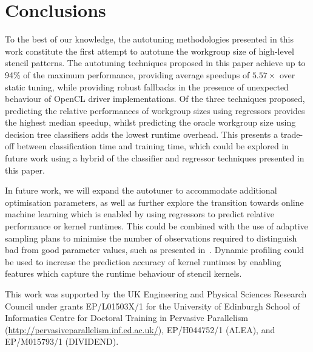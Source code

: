 \documentclass[preprint,nonatbib,10pt]{sigplanconf}
\begin{document}
\section{Conclusions}\label{sec:conclusions}

To the best of our knowledge, the autotuning methodologies presented
in this work constitute the first attempt to autotune the workgroup
size of high-level stencil patterns. The autotuning techniques
proposed in this paper achieve up to 94\% of the maximum performance,
providing average speedups of $5.57\times$ over static tuning, while
providing robust fallbacks in the presence of unexpected behaviour of
OpenCL driver implementations. Of the three techniques proposed,
predicting the relative performances of workgroup sizes using
regressors provides the highest median speedup, whilst predicting the
oracle workgroup size using decision tree classifiers adds the lowest
runtime overhead. This presents a trade-off between classification
time and training time, which could be explored in future work using a
hybrid of the classifier and regressor techniques presented in this
paper.

In future work, we will expand the autotuner to accommodate additional
optimisation parameters, as well as further explore the transition
towards online machine learning which is enabled by using regressors
to predict relative performance or kernel runtimes. This could be
combined with the use of adaptive sampling plans to minimise the
number of observations required to distinguish bad from good parameter
values, such as presented in~\cite{Leather2009}. Dynamic profiling
could be used to increase the prediction accuracy of kernel runtimes
by enabling features which capture the runtime behaviour of stencil
kernels.


\acks

This work was supported by the UK Engineering and Physical Sciences
Research Council under grants EP/L01503X/1 for the University of
Edinburgh School of Informatics Centre for Doctoral Training in
Pervasive Parallelism
(\url{http://pervasiveparallelism.inf.ed.ac.uk/}), EP/H044752/1
(ALEA), and EP/M015793/1 (DIVIDEND).


\label{bibliography}
\printbibliography
\end{document}
